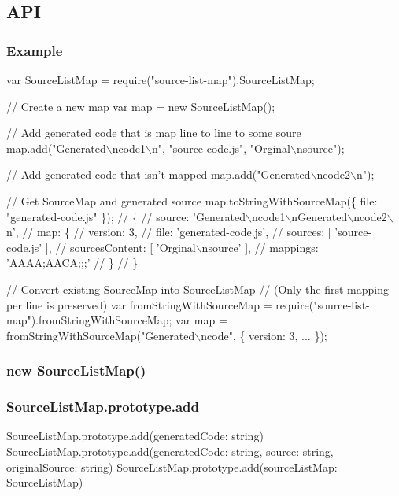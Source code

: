 \subsection*{A\+PI}

\subsubsection*{Example}


\begin{DoxyCode}
var SourceListMap = require("source-list-map").SourceListMap;

// Create a new map
var map = new SourceListMap();

// Add generated code that is map line to line to some soure
map.add("Generated\(\backslash\)ncode1\(\backslash\)n", "source-code.js", "Orginal\(\backslash\)nsource");

// Add generated code that isn't mapped
map.add("Generated\(\backslash\)ncode2\(\backslash\)n");

// Get SourceMap and generated source
map.toStringWithSourceMap(\{ file: "generated-code.js" \});
// \{
//   source: 'Generated\(\backslash\)ncode1\(\backslash\)nGenerated\(\backslash\)ncode2\(\backslash\)n',
//   map: \{
//      version: 3,
//      file: 'generated-code.js',
//      sources: [ 'source-code.js' ],
//      sourcesContent: [ 'Orginal\(\backslash\)nsource' ],
//      mappings: 'AAAA;AACA;;;'
//    \}
// \}

// Convert existing SourceMap into SourceListMap
// (Only the first mapping per line is preserved)
var fromStringWithSourceMap = require("source-list-map").fromStringWithSourceMap;
var map = fromStringWithSourceMap("Generated\(\backslash\)ncode", \{ version: 3, ... \});
\end{DoxyCode}


\subsubsection*{{\ttfamily new Source\+List\+Map()}}

\subsubsection*{{\ttfamily Source\+List\+Map.\+prototype.\+add}}


\begin{DoxyCode}
SourceListMap.prototype.add(generatedCode: string)
SourceListMap.prototype.add(generatedCode: string, source: string, originalSource: string)
SourceListMap.prototype.add(sourceListMap: SourceListMap)
\end{DoxyCode}


